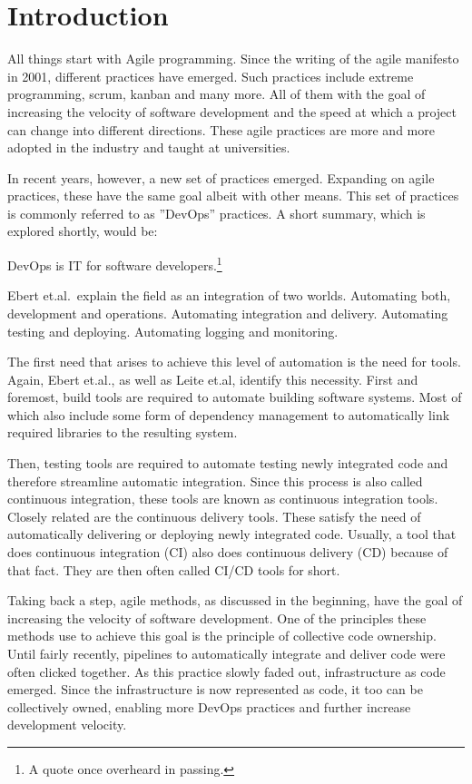 \chapter{Introduction}
\label{ch:introduction}

All things start with Agile programming.
Since the writing of the agile manifesto\cite{AgileManifesto} in 2001, different practices have emerged.
Such practices include extreme programming, scrum, kanban and many more\cite{ADecadeOfAgileMethodologies}.
All of them with the goal of increasing the velocity of software development and the speed at which a project can change into different directions.
These agile practices are more and more adopted in the industry\cite{BecomingAgileTogether} and taught at universities\cite{StudienhandbuchProjectManagement}.

In recent years, however, a new set of practices emerged.
Expanding on agile practices, these have the same goal albeit with other means.
This set of practices is commonly referred to as ''DevOps'' practices.
A short summary, which is explored shortly, would be:

DevOps is IT for software developers.\footnote{A quote once overheard in passing.}

Ebert et.al.\ explain the field as an integration of two worlds\cite{DevOps}.
Automating both, development and operations.
Automating integration and delivery.
Automating testing and deploying.
Automating logging and monitoring.

The first need that arises to achieve this level of automation is the need for tools.
Again, Ebert et.al., as well as Leite et.al, identify this necessity\cite{DevOps, ASurveyofDevOpsConceptsandChallenges}.
First and foremost, build tools are required to automate building software systems.
Most of which also include some form of dependency management to automatically link required libraries to the resulting system.

Then, testing tools are required to automate testing newly integrated code and therefore streamline automatic integration.
Since this process is also called continuous integration, these tools are known as continuous integration tools\cite{DevOps}.
Closely related are the continuous delivery tools.
These satisfy the need of automatically delivering or deploying newly integrated code.
Usually, a tool that does continuous integration (CI) also does continuous delivery (CD) because of that fact.
They are then often called CI/CD tools for short.

Taking back a step, agile methods, as discussed in the beginning, have the goal of increasing the velocity of software development\cite{ADecadeOfAgileMethodologies}.
One of the principles these methods use to achieve this goal is the principle of collective code ownership\cite{CommonAgilePracticesInSoftwareProcesses, ManagingCodeOwnership}.
Until fairly recently, pipelines to automatically integrate and deliver code were often clicked together\cite{JenkinsClassicUi}.
As this practice slowly faded out, infrastructure as code emerged\cite{ASystematicMappingStudyOfInfrastructureAsCodeResearch}.
Since the infrastructure is now represented as code, it too can be collectively owned, enabling more DevOps practices and further increase development velocity.

